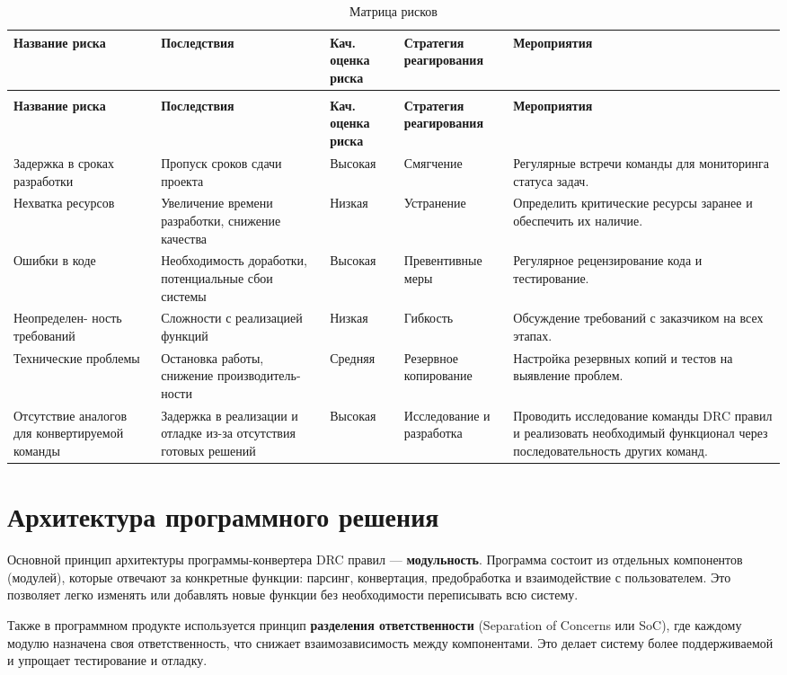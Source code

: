 \begin{longtable}{|p{3cm}|p{3cm}|p{2cm}|p{3cm}|p{4cm}|}
	\caption{Матрица рисков} \label{table:risk:matrix} \\
	\hline
	\textbf{Название риска}
	& \textbf{Последствия}
	& \textbf{Кач. оценка риска}
	& \textbf{Стратегия реагирования}
	& \textbf{Мероприятия} \\ \hline
	\endfirsthead
	\conttable{table:risk:matrix} \\
	\hline
	\textbf{Название риска}
	& \textbf{Последствия}
	& \textbf{Кач. оценка риска}
	& \textbf{Стратегия реагирования}
	& \textbf{Мероприятия} \\ \hline
	\endhead
	Задержка в сроках разработки
	& Пропуск сроков сдачи проекта
	& Высокая
	& Смягчение 
	& Регулярные встречи команды для мониторинга статуса задач. \\ \hline
	Нехватка ресурсов
	& Увеличение времени разработки, снижение качества
	& Низкая
	& Устранение
	& Определить критические ресурсы заранее и обеспечить их наличие. \\ \hline
	Ошибки в коде
	& Необходимость доработки, потенциальные сбои системы
	& Высокая
	& Превентивные меры
	& Регулярное рецензирование кода и тестирование. \\ \hline
	Неопределен- ность требований
	& Сложности с реализацией функций
	& Низкая
	& Гибкость
	& Обсуждение требований с заказчиком на всех этапах. \\ \hline
	Технические проблемы
	& Остановка работы, снижение производитель- ности
	& Средняя
	& Резервное копирование
	& Настройка резервных копий и тестов на выявление проблем. \\ \hline
	Отсутствие аналогов для конвертируемой команды
	& Задержка в реализации и отладке из-за отсутствия готовых решений
	& Высокая
	& Исследование и разработка
	& Проводить исследование команды DRC правил
	и реализовать необходимый функционал через последовательность
	других команд. \\ \hline
\end{longtable}

\section{Архитектура программного решения}

Основной принцип архитектуры программы-конвертера DRC правил
--- \textbf{модульность}.
Программа состоит из отдельных компонентов (модулей),
которые отвечают за конкретные функции:
парсинг, конвертация, предобработка и взаимодействие с пользователем.
Это позволяет легко изменять или добавлять новые функции
без необходимости переписывать всю систему.\par
Также в программном продукте используется принцип
\textbf{разделения ответственности} 
(Separation of Concerns или SoC), где каждому модулю назначена
своя ответственность, что снижает взаимозависимость между компонентами.
Это делает систему более поддерживаемой и упрощает тестирование и отладку.

